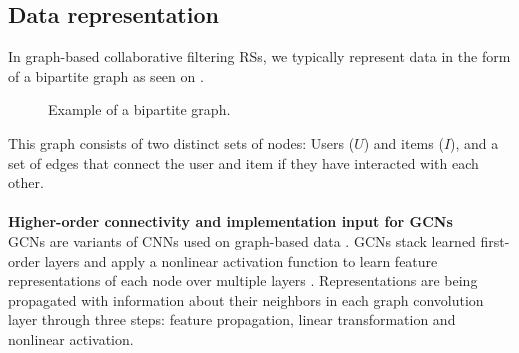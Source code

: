 \subsection{Data representation}
In graph-based collaborative filtering RSs, we typically represent data in the form of a bipartite graph as seen on .
\begin{figure}[h]
\caption{Example of a bipartite graph.}
\label{fig:bipartite-graph}
\end{figure}
This graph consists of two distinct sets of nodes: Users ($U$) and items ($I$), and a set of edges that connect the user and item if they have interacted with each other.\\\\
\textbf{Higher-order connectivity and implementation input for GCNs}
\\
GCNs are variants of CNNs used on graph-based data \cite{KOrderConnectivity}.
GCNs stack learned first-order layers and apply a nonlinear activation function to learn feature representations of each node over multiple layers \cite{KOrderConnectivity}.
Representations are being propagated with information about their neighbors in each graph convolution layer through three steps: feature propagation, linear transformation and nonlinear activation.
